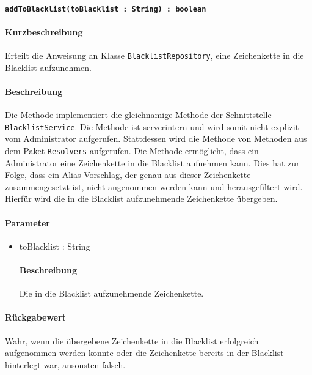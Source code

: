 \paragraph{\texttt{addToBlacklist(toBlacklist : String) : boolean}}%
\paragraph*{Kurzbeschreibung}
Erteilt die Anweisung an Klasse \texttt{BlacklistRepository}, eine Zeichenkette in die Blacklist aufzunehmen.
\paragraph*{Beschreibung}
Die Methode implementiert die gleichnamige Methode der Schnittstelle \texttt{BlacklistService}.
Die Methode ist serverintern und wird somit nicht explizit vom Administrator aufgerufen.
Stattdessen wird die Methode von Methoden aus dem Paket \texttt{Resolvers} aufgerufen.
Die Methode ermöglicht, dass ein Administrator eine Zeichenkette in die Blacklist aufnehmen kann.
Dies hat zur Folge, dass ein Alias-Vorschlag, der genau aus dieser Zeichenkette zusammengesetzt ist, nicht angenommen werden kann und herausgefiltert wird.
Hierfür wird die in die Blacklist aufzunehmende Zeichenkette übergeben.
\paragraph*{Parameter}
\begin{itemize}
    \item toBlacklist : String
    		\paragraph*{Beschreibung}
    		Die in die Blacklist aufzunehmende Zeichenkette.
\end{itemize}
\paragraph*{Rückgabewert}
Wahr, wenn die übergebene Zeichenkette in die Blacklist erfolgreich aufgenommen werden konnte oder die Zeichenkette bereits in der Blacklist hinterlegt war, ansonsten falsch.
